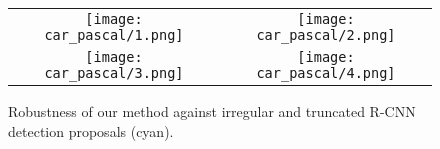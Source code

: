 \begin{figure}[h]
\setlength\tabcolsep{5pt}
\begin{tabular}{cc}
  \texttt{[image: car\_pascal/1.png]} &   
  \texttt{[image: car\_pascal/2.png]} \\   
  \texttt{[image: car\_pascal/3.png]} &   
  \texttt{[image: car\_pascal/4.png]} \\   
\end{tabular}
\caption{Robustness of our method against irregular and truncated
  R-CNN detection proposals (cyan).}
  \label{fig:stability}
\end{figure}



